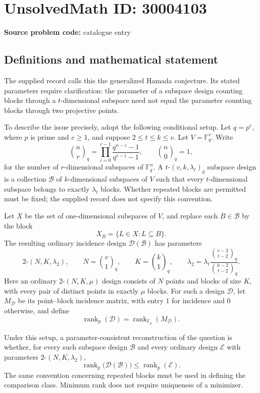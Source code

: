 \documentclass[11pt]{article}
\newcommand{\F}{\mathbb{F}}
\begin{document}
\section*{UnsolvedMath ID: 30004103}
\textbf{Source problem code:} catalogue entry
\subsection{Definitions and mathematical statement}
The supplied record calls this the generalized Hamada conjecture. Its stated parameters require clarification: the parameter of a subspace design counting blocks through a \(t\)-dimensional subspace need not equal the parameter counting blocks through two projective points.

To describe the issue precisely, adopt the following conditional setup. Let \(q=p^e\), where \(p\) is prime and \(e\geq 1\), and suppose \(2\leq t\leq k\leq v\). Let \(V=\F_q^v\). Write
\[
\binom{n}{r}_q=\prod_{i=0}^{r-1}\frac{q^{n-i}-1}{q^{r-i}-1},\qquad \binom{n}{0}_q=1,
\]
for the number of \(r\)-dimensional subspaces of \(\F_q^n\). A \(t\text{-}(v,k,\lambda_t)_q\) subspace design is a collection \(\mathcal B\) of \(k\)-dimensional subspaces of \(V\) such that every \(t\)-dimensional subspace belongs to exactly \(\lambda_t\) blocks. Whether repeated blocks are permitted must be fixed; the supplied record does not specify this convention.

Let \(X\) be the set of one-dimensional subspaces of \(V\), and replace each \(B\in\mathcal B\) by the block
\[
X_B=\{L\in X:L\subseteq B\}.
\]
The resulting ordinary incidence design \(\mathcal D(\mathcal B)\) has parameters
\[
2\text{-}(N,K,\lambda_2),\qquad
N=\binom{v}{1}_q,\qquad K=\binom{k}{1}_q,\qquad
\lambda_2=\lambda_t\frac{\binom{v-2}{t-2}_q}{\binom{k-2}{t-2}_q}.
\]
Here an ordinary \(2\text{-}(N,K,\mu)\) design consists of \(N\) points and blocks of size \(K\), with every pair of distinct points in exactly \(\mu\) blocks. For such a design \(\mathcal D\), let \(M_{\mathcal D}\) be its point--block incidence matrix, with entry \(1\) for incidence and \(0\) otherwise, and define
\[
\operatorname{rank}_p(\mathcal D)=\operatorname{rank}_{\F_p}(M_{\mathcal D}).
\]

Under this setup, a parameter-consistent reconstruction of the question is whether, for every such subspace design \(\mathcal B\) and every ordinary design \(\mathcal E\) with parameters \(2\text{-}(N,K,\lambda_2)\),
\[
\operatorname{rank}_p\bigl(\mathcal D(\mathcal B)\bigr)
\leq \operatorname{rank}_p(\mathcal E).
\]
The same convention concerning repeated blocks must be used in defining the comparison class. Minimum rank does not require uniqueness of a minimizer.
\end{document}
